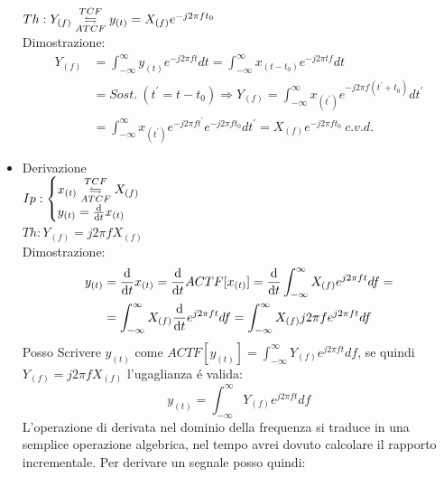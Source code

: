 \begin{itemize}
{                    $Th: Y_{(f)} \overunderset{TCF}{ATCF}{\leftrightharpoons} y_{(t)} = X_{(f)}e^{-j2\pi ft_0}$\\ 
                    Dimostrazione:
                    \begin{align}
                        Y_{(f)} & = \int_{-\infty}^{\infty} y_{(t)} e^{-j2\pi ft} dt = \int_{-\infty}^{\infty} x_{(t-t_0)} e^{-j2\pi tf} dt \nonumber \\
                                & =Sost.\ (t^\prime = t-t_0) \Rightarrow  Y_{(f)} = \int_{-\infty}^{\infty} x_{(t^\prime)} e^{-j2\pi f(t^\prime+t_0)} dt^\prime \nonumber \\
                                & =\int_{-\infty}^{\infty} x_{(t^\prime)} e^{-j2\pi ft^\prime}e^{-j2\pi ft_0} dt^\prime= X_{(f)}e^{-j2\pi ft_0}\ c.v.d.  \nonumber
                    \end{align}
                }
                \item{Derivazione\\
                    $Ip:\begin{cases}
                        x_{(t)}\overunderset{TCF}{ATCF}{\leftrightharpoons} X_{(f)}\\
                        y_{(t)}= \derivative{}{t} x_{(t)}        
                    \end{cases}$\\
                    $Th: Y_{(f)} = j2\pi f X_{(f)} $ \\
                    Dimostrazione:\\
                    \begin{align}
                        y_{(t)} &= \derivative{}{t} x_{(t)} = \derivative{}{t} ACTF[x_{(t)}] =\derivative{}{t} \int_{-\infty}^{\infty} X_{(f)}e^{j2\pi ft} df = \nonumber\\
                                &= \int_{-\infty}^{\infty} X_{(f)}\derivative{}{t}e^{j2\pi ft} df = \int_{-\infty}^{\infty} X_{(f)}j2\pi fe^{j2\pi ft} df \nonumber
                    \end{align}
                    Posso Scrivere $y_{(t)}$ come $ACTF[y_{(t)}] = \int_{-\infty}^{\infty} Y_{(f)}e^{j2\pi ft} df $, se quindi $Y_{(f)} = j2\pi f X_{(f)}$ l'ugaglianza é valida:
                    \[
                        y_{(t)} =\int_{-\infty}^{\infty} Y_{(f)}e^{j2\pi ft} df
                    \]
                    L'operazione di derivata nel dominio della frequenza si traduce in una semplice operazione algebrica, nel tempo avrei dovuto calcolare il 
                    rapporto incrementale. Per derivare un segnale posso quindi:
}
\end{itemize}
